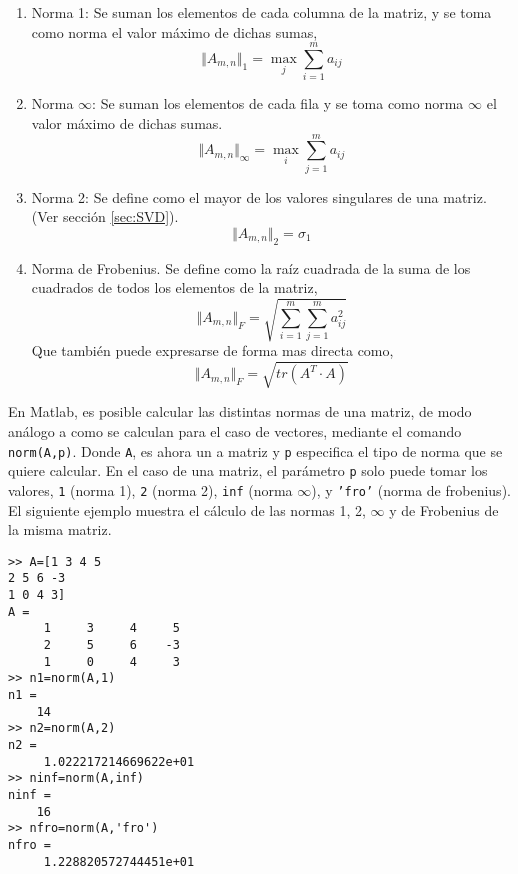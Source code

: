 \begin{enumerate}
\item Norma 1: Se suman los elementos de cada columna de la matriz, y se toma como norma el valor máximo de dichas sumas,
\begin{equation*}
\Vert A_{m,n} \Vert _{1} = \max_j \sum_{i=1}^m a_{ij}
\end{equation*}
 \item Norma $\infty$: Se suman los elementos de cada fila y se toma como norma $\infty$ el valor máximo de dichas sumas.
\begin{equation*}
\Vert A_{m,n} \Vert _{\infty} = \max_i \sum_{j=1}^m a_{ij}
\end{equation*}

\item Norma 2: Se define como el mayor de los valores singulares de una matriz. (Ver sección \ref{sec:SVD}).
\begin{equation*}
\Vert A_{m,n} \Vert _2 = \sigma_{1}
\end{equation*}
\item Norma de Frobenius. Se define como la raíz cuadrada de la suma de los cuadrados de todos los elementos de la matriz,
\begin{equation*}
\Vert A_{m,n} \Vert _F =\sqrt{\sum_{i=1}^m \sum_{j=1}^m a_{ij}^2}
\end{equation*}
Que también puede expresarse de forma mas directa como,
\begin{equation*}
\Vert A_{m,n} \Vert _F =\sqrt{tr(A^T\cdot A)}
\end{equation*}
\end{enumerate}
En Matlab, es posible calcular las distintas normas de una matriz, de modo análogo a como se calculan para el caso de vectores,  mediante el comando \texttt{norm(A,p)}. Donde \texttt{A}, es ahora un a matriz y \texttt{p} especifica el tipo de norma que se quiere calcular. En el caso de una matriz, el parámetro \texttt{p} solo puede tomar los valores, \texttt{1} (norma 1), \texttt{2} (norma 2), \texttt{inf} (norma $\infty$), y \texttt{'fro'} (norma de frobenius). El siguiente ejemplo muestra el cálculo de las normas 1, 2, $\infty$ y de Frobenius de la misma matriz.
\begin{verbatim}
>> A=[1 3 4 5
2 5 6 -3
1 0 4 3]
A =
     1     3     4     5
     2     5     6    -3
     1     0     4     3
>> n1=norm(A,1)
n1 =
    14
>> n2=norm(A,2)
n2 =
     1.022217214669622e+01
>> ninf=norm(A,inf)
ninf =
    16
>> nfro=norm(A,'fro')
nfro =
     1.228820572744451e+01
\end{verbatim} 

